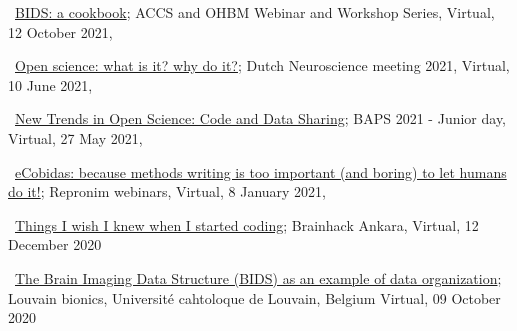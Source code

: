 \textbullet~\href{https://remi-gau.github.io/bids_cookbook/}{BIDS: a cookbook}; 
ACCS and OHBM Webinar and Workshop Series,
Virtual,
12 October 2021,


\textbullet~\href{https://osf.io/ce7tn/}{Open science: what is it? why do it?}; 
Dutch Neuroscience meeting 2021,
Virtual,
10 June 2021,


\textbullet~\href{https://osf.io/6kzn2/}{New Trends in Open Science: Code and Data Sharing}; 
BAPS 2021 - Junior day,
Virtual,
27 May 2021,


\textbullet~\href{https://osf.io/fb7tx/}{eCobidas: because methods writing is too important (and boring) to let humans do it!}; 
Repronim webinars,
Virtual,
8 January 2021,


\textbullet~\href{https://osf.io/vdgua/}{Things I wish I knew when I started coding}; 
Brainhack Ankara,
Virtual,
12 December 2020


\textbullet~\href{https://osf.io/zf5x8/}{The Brain Imaging Data Structure (BIDS) as an example of data organization}; 
Louvain bionics, Université cahtoloque de Louvain, Belgium
Virtual,
09 October 2020

